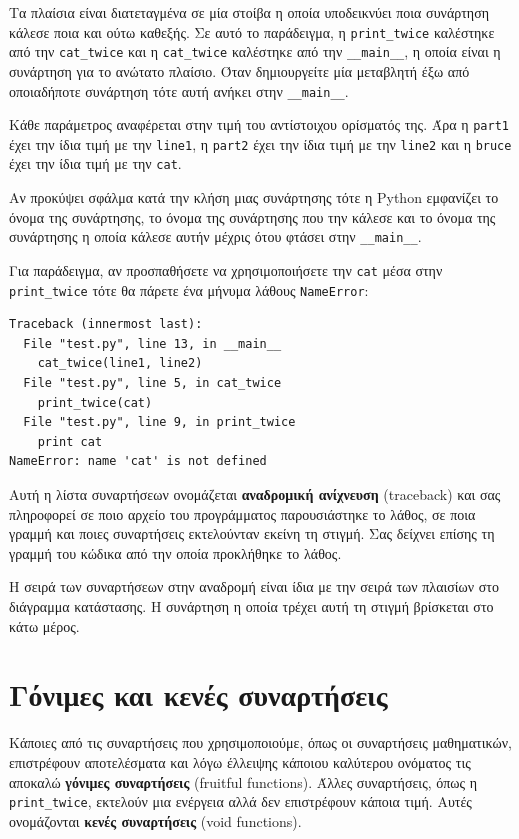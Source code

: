 \documentclass[10pt]{book}
\begin{document}
Τα πλαίσια είναι διατεταγμένα σε μία στοίβα
η οποία υποδεικνύει ποια συνάρτηση κάλεσε ποια και ούτω καθεξής. Σε αυτό το
παράδειγμα, η \verb"print_twice" καλέστηκε από την \verb"cat_twice"
και η \verb"cat_twice" καλέστηκε από την \verb"__main__",
η οποία είναι η συνάρτηση για το ανώτατο πλαίσιο. Όταν δημιουργείτε μία
μεταβλητή έξω από οποιαδήποτε συνάρτηση τότε αυτή ανήκει στην \verb"__main__".


Κάθε παράμετρος αναφέρεται στην τιμή του αντίστοιχου ορίσματός της.
Άρα η {\tt part1} έχει την ίδια τιμή με την {\tt line1}, 
η {\tt part2} έχει την ίδια τιμή με την {\tt line2}  και
η {\tt bruce} έχει την ίδια τιμή με την {\tt cat}.


Αν προκύψει σφάλμα κατά την κλήση μιας συνάρτησης τότε η Python
εμφανίζει το όνομα της συνάρτησης, το όνομα της συνάρτησης που την κάλεσε
και το όνομα της συνάρτησης η οποία κάλεσε αυτήν μέχρις ότου φτάσει στην
\verb"__main__".


Για παράδειγμα, αν προσπαθήσετε να χρησιμοποιήσετε την  {\tt cat} 
μέσα στην \verb"print_twice" τότε θα πάρετε ένα μήνυμα λάθους {\tt NameError}:


\begin{verbatim}
Traceback (innermost last):
  File "test.py", line 13, in __main__
    cat_twice(line1, line2)
  File "test.py", line 5, in cat_twice
    print_twice(cat)
  File "test.py", line 9, in print_twice
    print cat
NameError: name 'cat' is not defined
\end{verbatim}
%

Αυτή η λίστα συναρτήσεων ονομάζεται {\bf αναδρομική ανίχνευση} (traceback) και σας πληροφορεί σε ποιο αρχείο του προγράμματος παρουσιάστηκε το λάθος, σε ποια γραμμή και ποιες συναρτήσεις εκτελούνταν εκείνη τη στιγμή. Σας δείχνει επίσης τη γραμμή του κώδικα από την οποία προκλήθηκε το λάθος.

Η σειρά των συναρτήσεων στην αναδρομή είναι ίδια με την σειρά των
πλαισίων στο διάγραμμα κατάστασης. Η συνάρτηση η οποία τρέχει αυτή τη στιγμή 
βρίσκεται στο κάτω μέρος.



\section{Γόνιμες και κενές συναρτήσεις}

Κάποιες από τις συναρτήσεις που χρησιμοποιούμε, όπως οι συναρτήσεις
μαθηματικών, επιστρέφουν αποτελέσματα και λόγω έλλειψης κάποιου καλύτερου ονόματος τις αποκαλώ {\bf γόνιμες συναρτήσεις} (fruitful functions). Άλλες συναρτήσεις, όπως η \verb"print_twice", εκτελούν μια ενέργεια αλλά δεν επιστρέφουν κάποια τιμή. Αυτές ονομάζονται {\bf κενές συναρτήσεις} (void functions).
\end{document}
